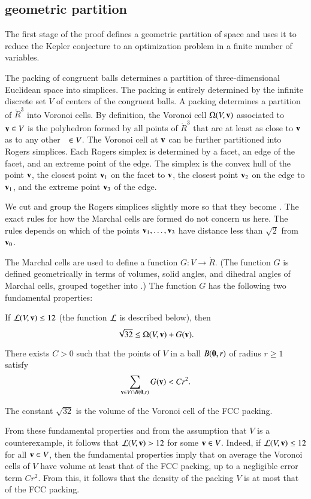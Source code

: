 \subsection{geometric partition}

The first stage of the proof defines a geometric partition of space
and uses it to reduce the Kepler conjecture to an optimization problem
in a finite number of variables.

The packing of congruent balls determines a partition of
three-dimensional Euclidean space into simplices.  The packing is
entirely determined by the infinite discrete set $V$ of centers of the
congruent balls.  A packing determines a partition of $\ring{R}^3$
into Voronoi cells.  By definition, the Voronoi cell $\Omega(V,{\mathbf v})$
associated to ${\mathbf v}\in V$ is the polyhedron formed by all points of
$\ring{R}^3$ that are at least as close to ${\mathbf v}$ as to any other $\hskip0.65em\in
V$.  The Voronoi cell at ${\mathbf v}$ can be further partitioned into Rogers
simplices.  Each Rogers simplex is determined by a facet, an edge of
the facet, and an extreme point of the edge.  The simplex is the
convex hull of the point ${\mathbf v}$, the closest point ${\mathbf v}_1$ on the facet
to ${\mathbf v}$, the closest point ${\mathbf v}_2$ on the edge to ${\mathbf v}_1$, and the
extreme point ${\mathbf v}_3$ of the edge.


We cut and group the Rogers simplices slightly more so that they
become .  The exact rules for how the Marchal cells
are formed do not concern us here.  The rules depends on which of the
points ${\mathbf v}_1,\ldots,{\mathbf v}_3$ have distance  less than $\sqrt2$ from
${\mathbf v}_0$.

The Marchal cells are used to define a function $G:V\to \ring{R}$.
(The function $G$ is defined geometrically in terms of volumes, solid
angles, and dihedral angles of Marchal cells, grouped together into
.)  The function $G$ has the following two
fundamental properties:
\begin{description}
\item {} If ${\mathcal L}(V,{\mathbf v})\le 12$ 
(the function ${\mathcal L}$ is  described below), then 
\[
\sqrt{32}\le \Omega(V,{\mathbf v}) +G({\mathbf v}).
\]
\item {}   There exists $C>0$ such that the points of $V$ in a ball $B({\mathbf 0},r)$
of radius $r\ge 1$ satisfy
\[
\sum_{{\mathbf v}\in V \cap B({\mathbf 0},r)} G({\mathbf v}) < C r^2.
\]
\end{description}
The constant $\sqrt{32}$ is the volume of the Voronoi cell of the FCC packing.

From these fundamental properties and from the assumption that $V$ is a counterexample,
it follows that ${\mathcal L}(V,{\mathbf v})>12$ for some ${\mathbf v}\in V$.  Indeed, if ${\mathcal L}(V,{\mathbf v})\le 12$ for all
${\mathbf v}\in V$, then the fundamental properties
imply that on average the Voronoi cells of $V$ have volume at least that of the FCC packing, up to a negligible error term $C r^2$.  From this, it follows that the density
of the packing $V$ is at most that of the FCC packing.

